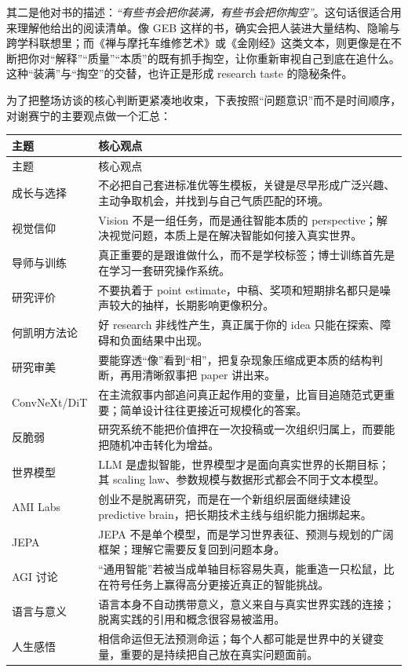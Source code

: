 \documentclass[a4paper,12pt]{article}
\begin{document}
其二是他对书的描述：\textit{``有些书会把你装满，有些书会把你掏空''}。这句话很适合用来理解他给出的阅读清单。像 GEB 这样的书，确实会把人装进大量结构、隐喻与跨学科联想里；而《禅与摩托车维修艺术》或《金刚经》这类文本，则更像是在不断把你对“解释”“质量”“本质”的既有抓手掏空，让你重新审视自己到底在追什么。这种“装满”与“掏空”的交替，也许正是形成 research taste 的隐秘条件。

为了把整场访谈的核心判断更紧凑地收束，下表按照“问题意识”而不是时间顺序，对谢赛宁的主要观点做一个汇总：

\begin{longtable}{>{\raggedright\arraybackslash}p{} >{\raggedright\arraybackslash}p{}}
\toprule
主题 & 核心观点 \\
\midrule
\endfirsthead
\toprule
主题 & 核心观点 \\
\midrule
\endhead
成长与选择 & 不必把自己套进标准优等生模板，关键是尽早形成广泛兴趣、主动争取机会，并找到与自己气质匹配的环境。 \\
视觉信仰 & Vision 不是一组任务，而是通往智能本质的 perspective；解决视觉问题，本质上是在解决智能如何接入真实世界。 \\
导师与训练 & 真正重要的是跟谁做什么，而不是学校标签；博士训练首先是在学习一套研究操作系统。 \\
研究评价 & 不要执着于 point estimate，中稿、奖项和短期排名都只是噪声较大的抽样，长期影响更像积分。 \\
何凯明方法论 & 好 research 非线性产生，真正属于你的 idea 只能在探索、障碍和负面结果中出现。 \\
研究审美 & 要能穿透“像”看到“相”，把复杂现象压缩成更本质的结构判断，再用清晰叙事把 paper 讲出来。 \\
ConvNeXt/DiT & 在主流叙事内部追问真正起作用的变量，比盲目追随范式更重要；简单设计往往更接近可规模化的答案。 \\
反脆弱 & 研究系统不能把价值押在一次投稿或一次组织归属上，而要能把随机冲击转化为增益。 \\
世界模型 & LLM 是虚拟智能，世界模型才是面向真实世界的长期目标；其 scaling law、参数规模与数据形式都会不同于文本模型。 \\
AMI Labs & 创业不是脱离研究，而是在一个新组织层面继续建设 predictive brain，把长期技术主线与组织能力捆绑起来。 \\
JEPA & JEPA 不是单个模型，而是学习世界表征、预测与规划的广阔框架；理解它需要反复回到问题本身。 \\
AGI 讨论 & “通用智能”若被当成单轴目标容易失真，能重造一只松鼠，比在符号任务上赢得高分更接近真正的智能挑战。 \\
语言与意义 & 语言本身不自动携带意义，意义来自与真实世界实践的连接；脱离实践的引用和概念很容易被滥用。 \\
人生感悟 & 相信命运但无法预测命运；每个人都可能是世界中的关键变量，重要的是持续把自己放在真实问题面前。 \\
\bottomrule
\end{longtable}
\end{document}

